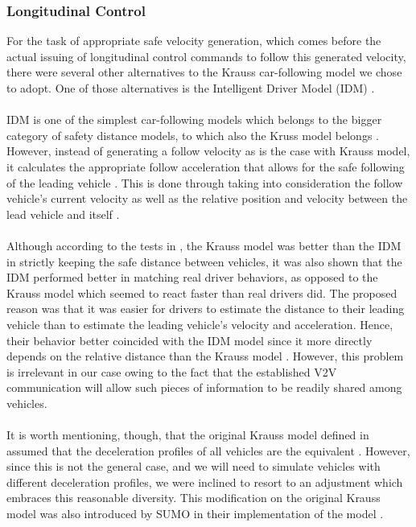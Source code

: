 \subsubsection{Longitudinal Control}
\label{des_long_ctrl}
For the task of appropriate safe velocity generation, which comes before the actual issuing of longitudinal control commands to follow this generated velocity, there were several other alternatives to the Krauss car-following model we chose to adopt. One of those alternatives is the Intelligent Driver Model (IDM) \cite{idmorg}. \\ \\
IDM is one of the simplest car-following models which belongs to the bigger category of safety distance models, to which also the Kruss model belongs \cite{cfmodels}\cite{IDM}. However, instead of generating a follow velocity as is the case with Krauss model, it calculates the appropriate follow acceleration that allows for the safe following of the leading vehicle \cite{IDM}. This is done through taking into consideration the follow vehicle’s current velocity as well as the relative position and velocity between the lead vehicle and itself \cite{IDM}. \\ \\
Although according to the tests in \cite{IDM}, the Krauss model was better than the IDM in strictly keeping the safe distance between vehicles, it was also shown that the IDM performed better in matching real driver behaviors, as opposed to the Krauss model which seemed to react faster than real drivers did. The proposed reason was that it was easier for drivers to estimate the distance to their leading vehicle than to estimate the leading vehicle’s velocity and acceleration. Hence, their behavior better coincided with the IDM model since it more directly depends on the relative distance than the Krauss model \cite{IDM}. However, this problem is irrelevant in our case owing to the fact that the established V2V communication will allow such pieces of information to be readily shared among vehicles. \\ \\
It is worth mentioning, though, that the original Krauss model defined in \cite{Krau1998MicroscopicMO} assumed that the deceleration profiles of all vehicles are the equivalent \cite{kraussnewmod}. However, since this is not the general case, and we will need to simulate vehicles with different deceleration profiles, we were inclined to resort to an adjustment which embraces this reasonable diversity. This modification on the original Krauss model was also introduced by SUMO in their implementation of the model \cite{SumoCF}.

